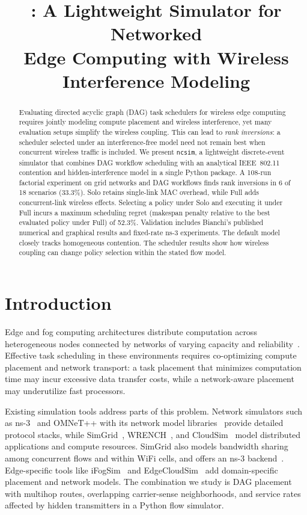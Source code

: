 \documentclass[conference]{IEEEtran}
\title{\ncsim{}: A Lightweight Simulator for Networked\\Edge Computing with Wireless Interference Modeling}
\author{
\IEEEauthorblockN{Bhaskar Krishnamachari\IEEEauthorrefmark{1},
Maya Gutierrez\IEEEauthorrefmark{1}, and
Jared Coleman\IEEEauthorrefmark{1}\IEEEauthorrefmark{2}}
\IEEEauthorblockA{\IEEEauthorrefmark{1}University of Southern California\\
bkrishna@usc.edu, mayaguti@usc.edu}
\IEEEauthorblockA{\IEEEauthorrefmark{2}Loyola Marymount University\\
jared.coleman@lmu.edu}
}
\newcommand{\ncsim}{\texttt{ncsim}}
\begin{document}
\maketitle

\begin{abstract}
Evaluating directed acyclic graph (DAG) task schedulers for wireless edge computing requires
jointly modeling compute placement and wireless interference, yet
many evaluation setups simplify the wireless coupling. This can lead to
\emph{rank inversions}: a scheduler selected under an interference-free
model need not remain best when concurrent wireless traffic is included.
We present \ncsim{}, a lightweight discrete-event simulator that combines
DAG workflow scheduling with an analytical IEEE~802.11 contention and
hidden-interference model in a single Python package. A 108-run factorial
experiment on grid networks and DAG workflows finds rank inversions
in 6 of 18 scenarios (33.3\%). Solo retains single-link MAC overhead,
while Full adds concurrent-link wireless effects. Selecting a policy under
Solo and executing it under Full incurs a maximum scheduling regret
(makespan penalty relative to the best evaluated policy under Full) of
52.3\%. Validation includes Bianchi's published numerical and
graphical results and fixed-rate ns-3 experiments.
The default model closely tracks homogeneous contention.
The scheduler results show how wireless coupling can change policy
selection within the stated flow model.

\end{abstract}

\section{Introduction}
\label{sec:intro}

Edge and fog computing architectures distribute computation across
heterogeneous nodes connected by networks of varying capacity and
reliability~\cite{shi2016edge}.  Effective task scheduling in these
environments requires co-optimizing compute placement and network transport:
a task placement that minimizes computation time may incur excessive data
transfer costs, while a network-aware placement may underutilize fast
processors.

Existing simulation tools address parts of this problem. Network simulators
such as ns-3~\cite{ns3} and OMNeT++ with its network model
libraries~\cite{omnetpp} provide detailed protocol stacks, while
SimGrid~\cite{simgrid}, WRENCH~\cite{wrench}, and CloudSim~\cite{cloudsim}
model distributed applications and compute resources. SimGrid also models
bandwidth sharing among concurrent flows and within WiFi cells, and offers
an ns-3 backend~\cite{simgridmodels,flowwifi2022}. Edge-specific
tools like iFogSim~\cite{ifogsim} and EdgeCloudSim~\cite{edgecloudsim} add
domain-specific placement and network models. The combination we study is
DAG placement with multihop routes, overlapping carrier-sense neighborhoods,
and service rates affected by hidden transmitters in a Python flow simulator.
\end{document}
